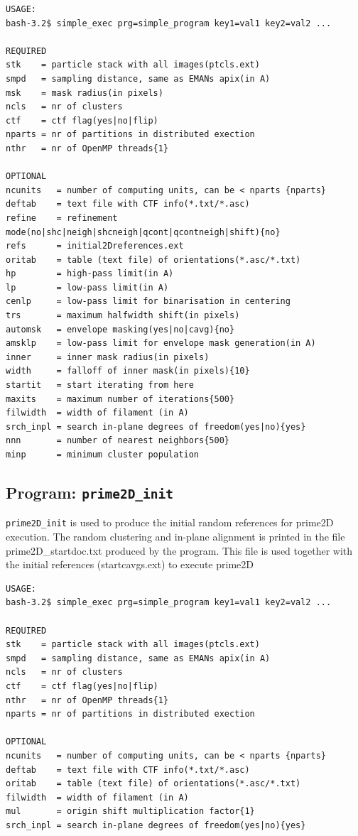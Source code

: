 \documentclass[a4paper,11pt]{article}
\newcommand{\prgname}[1]{\textcolor{NavyBlue}{\texttt{#1}}}
\begin{document}
\begin{verbatim}
USAGE:
bash-3.2$ simple_exec prg=simple_program key1=val1 key2=val2 ...

REQUIRED
stk    = particle stack with all images(ptcls.ext)
smpd   = sampling distance, same as EMANs apix(in A)
msk    = mask radius(in pixels)
ncls   = nr of clusters
ctf    = ctf flag(yes|no|flip)
nparts = nr of partitions in distributed exection
nthr   = nr of OpenMP threads{1}

OPTIONAL
ncunits   = number of computing units, can be < nparts {nparts}
deftab    = text file with CTF info(*.txt/*.asc)
refine    = refinement mode(no|shc|neigh|shcneigh|qcont|qcontneigh|shift){no}
refs      = initial2Dreferences.ext
oritab    = table (text file) of orientations(*.asc/*.txt)
hp        = high-pass limit(in A)
lp        = low-pass limit(in A)
cenlp     = low-pass limit for binarisation in centering
trs       = maximum halfwidth shift(in pixels)
automsk   = envelope masking(yes|no|cavg){no}
amsklp    = low-pass limit for envelope mask generation(in A)
inner     = inner mask radius(in pixels)
width     = falloff of inner mask(in pixels){10}
startit   = start iterating from here
maxits    = maximum number of iterations{500}
filwidth  = width of filament (in A)
srch_inpl = search in-plane degrees of freedom(yes|no){yes}
nnn       = number of nearest neighbors{500}
minp      = minimum cluster population
\end{verbatim}

\subsection{Program: \prgname{prime2D\_init}}
\label{prime2D_init}
\prgname{prime2D\_init} is used to produce the initial random references for prime2D execution. The random clustering and in-plane alignment is printed in the file prime2D\_startdoc.txt produced by the program. This file is used together with the initial references (startcavgs.ext) to execute prime2D

\begin{verbatim}
USAGE:
bash-3.2$ simple_exec prg=simple_program key1=val1 key2=val2 ...

REQUIRED
stk    = particle stack with all images(ptcls.ext)
smpd   = sampling distance, same as EMANs apix(in A)
ncls   = nr of clusters
ctf    = ctf flag(yes|no|flip)
nthr   = nr of OpenMP threads{1}
nparts = nr of partitions in distributed exection

OPTIONAL
ncunits   = number of computing units, can be < nparts {nparts}
deftab    = text file with CTF info(*.txt/*.asc)
oritab    = table (text file) of orientations(*.asc/*.txt)
filwidth  = width of filament (in A)
mul       = origin shift multiplication factor{1}
srch_inpl = search in-plane degrees of freedom(yes|no){yes}
\end{verbatim}
\end{document}

